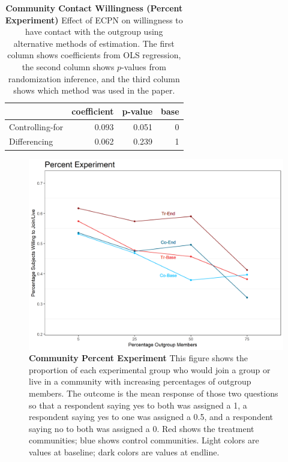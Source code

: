 \documentclass[
]{article}
\begin{document}
\begin{table}[H]
\begin{center}
\label{tab:percExp_tab}
\caption{\textbf{Community Contact Willingness (Percent Experiment)} Effect of ECPN on willingness to have contact with the outgroup using alternative methods of estimation. The first column shows coefficients from OLS regression, the second column shows $p$-values from randomization inference, and the third column shows which method was used in the paper.}
\smallskip

\begin{tabular}{l|r|r|r}
\hline
  & coefficient & p-value & base\\
\hline
Controlling-for & 0.093 & 0.051 & 0\\
\hline
Differencing & 0.062 & 0.239 & 1\\
\hline
\end{tabular}


\end{center}
\end{table}

\begin{figure}[H]
\begin{center}
\includegraphics[width=.8\textwidth]{figs/randComm_plot.png}
\caption{\label{fig:percExp_plot_comm} \textbf{Community Percent Experiment} This figure shows the proportion of each experimental group who would join a group or live in a community with increasing percentages of outgroup members. The outcome is the mean response of those two questions so that a respondent saying yes to both was assigned a 1, a respondent saying yes to one was assigned a 0.5, and a respondent saying no to both was assigned a 0. Red shows the treatment communities; blue shows control communities.  Light colors are values at baseline; dark colors are values at endline.}
\end{center}
\end{figure}
\end{document}

